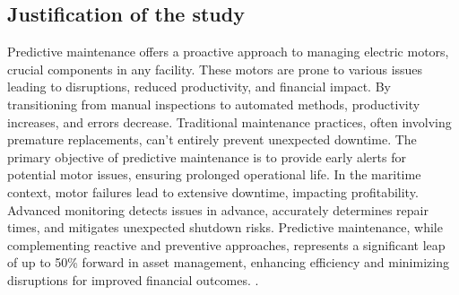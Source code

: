 \subsection{Justification of the study}
Predictive maintenance offers a proactive approach to managing electric motors, crucial components in any facility. These motors are prone to various issues leading to disruptions, reduced productivity, and financial impact. By transitioning from manual inspections to automated methods, productivity increases, and errors decrease. Traditional maintenance practices, often involving premature replacements, can't entirely prevent unexpected downtime. The primary objective of predictive maintenance is to provide early alerts for potential motor issues, ensuring prolonged operational life. In the maritime context, motor failures lead to extensive downtime, impacting profitability. Advanced monitoring detects issues in advance, accurately determines repair times, and mitigates unexpected shutdown risks. Predictive maintenance, while complementing reactive and preventive approaches, represents a significant leap of up to 50\% forward in asset management, enhancing efficiency and minimizing disruptions for improved financial outcomes. \cite{sampaio_prediction_2019}.  

